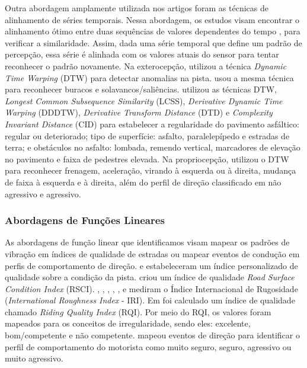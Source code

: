 Outra abordagem amplamente utilizada nos artigos foram as técnicas de alinhamento de séries temporais. Nessa abordagem, os estudos visam encontrar o alinhamento ótimo entre duas sequências de valores dependentes do tempo \cite{Muller2007}, para verificar a similaridade. Assim, dada uma série temporal que define um padrão de percepção, essa série é alinhada com os valores atuais do sensor para tentar reconhecer o padrão novamente. Na exterocepção,  utilizou a técnica \textit{Dynamic Time Warping} (DTW) para detectar anomalias na pista.  usou a mesma técnica para reconhecer buracos e solavancos/saliências.  utilizou as técnicas DTW, \textit{Longest Common Subsequence Similarity} (LCSS), \textit{Derivative Dynamic Time Warping} (DDDTW), \textit{Derivative Transform Distance} (DTD) e \textit{Complexity Invariant Distance} (CID) para estabelecer a regularidade do pavimento asfáltico: regular ou deteriorado; tipo de superfície: asfalto, paralelepípedo e estradas de terra; e obstáculos no asfalto: lombada, remendo vertical, marcadores de elevação no pavimento e faixa de pedestres elevada. Na propriocepção,  utilizou o DTW para reconhecer frenagem, aceleração, virando à esquerda ou à direita, mudança de faixa à esquerda e à direita, além do perfil de direção classificado em não agressivo e agressivo.

\subsubsection{Abordagens de Funções Lineares}

As abordagens de função linear que identificamos visam mapear os padrões de vibração em índices de qualidade de estradas ou mapear eventos de condução em perfis de comportamento de direção.  e  estabeleceram um índice personalizado de qualidade sobre a condição da pista. \cite{Brunauer2016} criou um índice de qualidade \textit{Road Surface Condition Index} (RSCI). , , , , ,  e  mediram o Índice Internacional de Rugosidade (\textit{International Roughness Index} - IRI). Em  foi calculado um índice de qualidade chamado \textit{Riding Quality Index} (RQI). Por meio do RQI, os valores foram mapeados para os conceitos de irregularidade, sendo eles: excelente, bom/competente e não competente.  mapeou eventos de direção para identificar o perfil de comportamento do motorista como muito seguro, seguro, agressivo ou muito agressivo.

